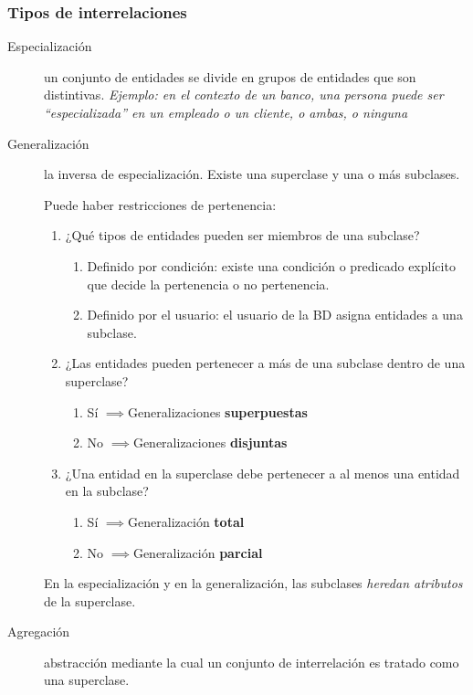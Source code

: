 \documentclass[a4paper, twoside]{article}
\begin{document}
\subsubsection{Tipos de interrelaciones}
\begin{description}
	\item[Especialización] un conjunto de entidades se divide en grupos de entidades que son distintivas. \emph{Ejemplo: en el contexto de un banco, una persona puede ser ``especializada'' en un empleado o un cliente, o ambas, o ninguna}

	\item[Generalización] la inversa de especialización. Existe una superclase y una o más subclases. 

	Puede haber restricciones de pertenencia:
	\begin{enumerate}
		\item ¿Qué tipos de entidades pueden ser miembros de una subclase?
		\begin{enumerate}
			\item Definido por condición: existe una condición o predicado explícito que decide la pertenencia o no pertenencia.
			\item Definido por el usuario: el usuario de la BD asigna entidades a una subclase.
		\end{enumerate}

		\item ¿Las entidades pueden pertenecer a más de una subclase dentro de una superclase?
		\begin{enumerate}
			\item Sí $\implies$Generalizaciones \textbf{superpuestas}
			\item No $\implies$Generalizaciones \textbf{disjuntas}
		\end{enumerate}

		\item ¿Una entidad en la superclase debe pertenecer a al menos una entidad en la subclase?
		\begin{enumerate}
			\item Sí $\implies$Generalización \textbf{total}
			\item No $\implies$Generalización \textbf{parcial}
		\end{enumerate}
	\end{enumerate}
	
	En la especialización y en la generalización, las subclases \emph{heredan atributos} de la superclase.
	
	\item[Agregación] abstracción mediante la cual un conjunto de interrelación es tratado como una superclase.
\end{description}
\end{document}
